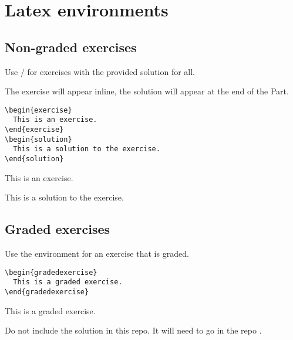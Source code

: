 
\section{Latex environments}

\subsection{Non-graded exercises}

Use / for exercises with the provided solution for all.

The exercise will appear inline, the solution will appear at the end of the Part.

\begin{verbatim}
\begin{exercise}
  This is an exercise.
\end{exercise}
\begin{solution}
  This is a solution to the exercise.
\end{solution}
\end{verbatim}

\begin{exercise}
  This is an exercise.
\end{exercise}
\begin{solution}
  This is a solution to the exercise.
\end{solution}

\subsection{Graded exercises}

Use the environment  for an exercise that is graded.

\begin{verbatim}
\begin{gradedexercise}
  This is a graded exercise.
\end{gradedexercise}
\end{verbatim}


\begin{gradedexercise}
  This is a graded exercise.
\end{gradedexercise}


Do not include the solution in this repo. It will need to go in the repo
.

